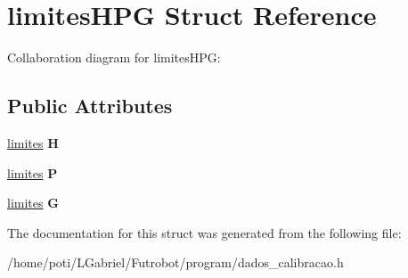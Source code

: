 \hypertarget{structlimitesHPG}{}\section{limites\+H\+PG Struct Reference}
\label{structlimitesHPG}


Collaboration diagram for limites\+H\+PG\+:
\subsection*{Public Attributes}
\begin{DoxyCompactItemize}
\item 
\hyperlink{structlimites}{limites} {\bfseries H}\hypertarget{structlimitesHPG_a9bce8221c522368f38d5d1843eb5a86a}{}\label{structlimitesHPG_a9bce8221c522368f38d5d1843eb5a86a}

\item 
\hyperlink{structlimites}{limites} {\bfseries P}\hypertarget{structlimitesHPG_aa4ea09b31c6ae0764be1ad0076b8d36a}{}\label{structlimitesHPG_aa4ea09b31c6ae0764be1ad0076b8d36a}

\item 
\hyperlink{structlimites}{limites} {\bfseries G}\hypertarget{structlimitesHPG_a6621ab9ad5ff05e01aecbb4a8aacb1dc}{}\label{structlimitesHPG_a6621ab9ad5ff05e01aecbb4a8aacb1dc}

\end{DoxyCompactItemize}


The documentation for this struct was generated from the following file\+:\begin{DoxyCompactItemize}
\item 
/home/poti/\+L\+Gabriel/\+Futrobot/program/dados\+\_\+calibracao.\+h\end{DoxyCompactItemize}
